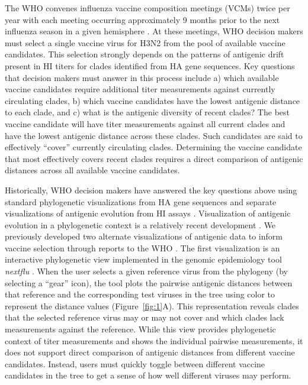 \documentclass[utf8]{FrontiersinHarvard} %
\begin{document}
The WHO convenes influenza vaccine composition meetings (VCMs) twice per year with each meeting occurring approximately 9 months prior to the next influenza season in a given hemisphere \citep{Morris:2017ea}.
At these meetings, WHO decision makers must select a single vaccine virus for H3N2 from the pool of available vaccine candidates.
This selection strongly depends on the patterns of antigenic drift present in HI titers for clades identified from HA gene sequences.
Key questions that decision makers must answer in this process include a) which available vaccine candidates require additional titer measurements against currently circulating clades, b) which vaccine candidates have the lowest antigenic distance to each clade, and c) what is the antigenic diversity of recent clades?
The best vaccine candidate will have titer measurements against all current clades and have the lowest antigenic distance across these clades.
Such candidates are said to effectively ``cover'' currently circulating clades.
Determining the vaccine candidate that most effectively covers recent clades requires a direct comparison of antigenic distances across all available vaccine candidates.

Historically, WHO decision makers have answered the key questions above using standard phylogenetic visualizations from HA gene sequences \citep{felsenstein:2003,lemey:2012} and separate visualizations of antigenic evolution from HI assays \citep{Smith:2004jc}.
Visualization of antigenic evolution in a phylogenetic context is a relatively recent development \citep{Steinbruck:2012ja,Bedford:2014bf,Neher:2016hy}.
We previously developed two alternate visualizations of antigenic data to inform vaccine selection through reports to the WHO \citep{BedfordWHO2018,BedfordWHO2019}.
The first visualization is an interactive phylogenetic view implemented in the genomic epidemiology tool \emph{nextflu} \citep{NeherBedford2015,NeherBedford2018}.
When the user selects a given reference virus from the phylogeny (by selecting a ``gear'' icon), the tool plots the pairwise antigenic distances between that reference and the corresponding test viruses in the tree using color to represent the distance values (Figure~\ref{fig:1}A).
This representation reveals clades that the selected reference virus may or may not cover and which clades lack measurements against the reference.
While this view provides phylogenetic context of titer measurements and shows the individual pairwise measurements, it does not support direct comparison of antigenic distances from different vaccine candidates.
Instead, users must quickly toggle between different vaccine candidates in the tree to get a sense of how well different viruses may perform.
\end{document}
